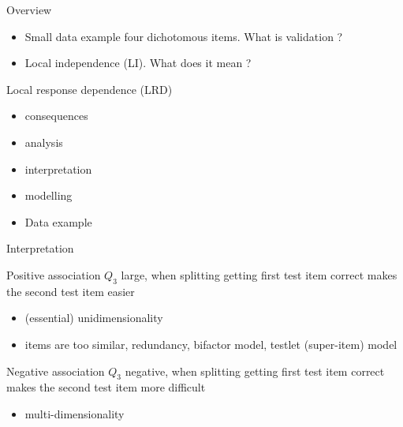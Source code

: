 \documentclass[xcolor=table]{beamer}
\begin{document}
\begin{frame}{Overview}
\begin{itemize}
\item[\checkmark] Small data example four dichotomous items. What is validation ?
\item[\checkmark] Local independence (LI). What does it mean ?
\end{itemize}
\begin{block}{Local response dependence (LRD)}
\begin{itemize}
\item[\checkmark] consequences
\item[\checkmark] analysis
\item[O] interpretation 
\item[O] modelling 
\end{itemize}
\end{block}
\begin{itemize}
\item[O] Data example
\end{itemize}
\end{frame}

\begin{frame}{Interpretation}
\begin{block}{Positive association}
$Q_3$ large, when splitting getting first test item correct makes the second test item easier
\pause
\begin{itemize}
\item (essential) unidimensionality 
\pause
\item items are too similar, redundancy, bifactor model, testlet (super-item) model
\end{itemize}
\end{block}
\begin{block}{Negative association}
$Q_3$ negative, when splitting getting first test item correct makes the second test item more difficult
\pause
\begin{itemize}
    \item multi-dimensionality
\end{itemize}
\end{block}
\end{frame}
\end{document}
